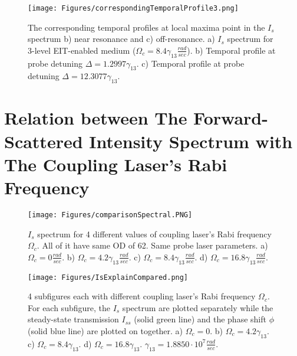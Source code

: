 \begin{figure}[h!]
    \centering
    \texttt{[image: Figures/correspondingTemporalProfile3.png]}
    \caption{The corresponding temporal profiles at local maxima point in the $I_{s}$ spectrum b) near resonance and c) off-resonance. a) $I_{s}$ spectrum for 3-level EIT-enabled medium ($\Omega_{c} = 8.4\gamma_{13} \frac{rad}{sec}$). b)  Temporal profile at probe detuning $\Delta = 1.2997\gamma_{13}$. c) Temporal profile at probe detuning $\Delta = 12.3077\gamma_{13}$.}
    \label{fig: corresponding temporal profile 3}
\end{figure}


\section{Relation between The Forward-Scattered Intensity Spectrum with The Coupling Laser's Rabi Frequency}

\begin{figure}
    \centering
    \texttt{[image: Figures/comparisonSpectral.PNG]}
    \caption{$I_{s}$ spectrum for 4 different values of coupling laser's Rabi frequency $\Omega_{c}$. All of it have same OD of 62. Same probe laser parameters. a) $\Omega_{c} = 0 \frac{rad}{sec}$. b) $\Omega_{c} = 4.2\gamma_{13} \frac{rad}{sec}$. c) $\Omega_{c} = 8.4\gamma_{13} \frac{rad}{sec}$. d) $\Omega_{c} = 16.8\gamma_{13} \frac{rad}{sec}$.}
    \label{fig: compare Is spectrums}
\end{figure}

\begin{figure}[h!]
    \centering
    \texttt{[image: Figures/IsExplainCompared.png]}
    \caption{4 subfigures each with different coupling laser's Rabi frequency $\Omega_{c}$. For each subfigure, the $I_{s}$ spectrum are plotted separately while the steady-state transmission $I_{ss}$ (solid green line) and the phase shift $\phi$ (solid blue line) are plotted on together. a) $\Omega_{c} = 0$. b) $\Omega_{c} = 4.2\gamma_{13}$. c) $\Omega_{c} = 8.4\gamma_{13}$. d) $\Omega_{c} = 16.8\gamma_{13}$. $\gamma_{13} = 1.8850 \cdot 10^{7} \frac{rad}{sec}$.}
    \label{fig: Is compared to transmission & phase shift}
\end{figure}
